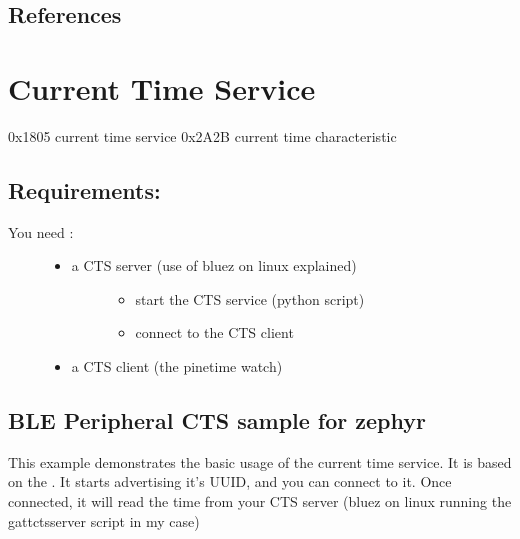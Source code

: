 \documentclass[letterpaper,10pt,english]{sphinxmanual}
\begin{document}
\section{References}
\label{\detokenize{RTC:references}}

\chapter{Current Time Service}
\label{\detokenize{current-time:current-time-service}}\label{\detokenize{current-time::doc}}
0x1805 current time service
0x2A2B current time characteristic


\section{Requirements:}
\label{\detokenize{current-time:requirements}}\begin{description}
\item[{You need :}] \leavevmode\begin{itemize}
\item {} \begin{description}
\item[{a CTS server (use of bluez on linux explained)}] \leavevmode\begin{itemize}
\item {} 
start the CTS service (python script)

\item {} 
connect to the CTS client

\end{itemize}

\end{description}

\item {} 
a CTS client (the pinetime watch)

\end{itemize}

\end{description}


\section{BLE Peripheral CTS sample for zephyr}
\label{\detokenize{current-time:ble-peripheral-cts-sample-for-zephyr}}
This example demonstrates the basic usage of the current time service.
It is based on the .
It starts advertising it’s UUID, and you can connect to it.
Once connected, it will read the time from your CTS server (bluez on linux running the gatt\sphinxhyphen{}cts\sphinxhyphen{}server script in my case)
\end{document}
